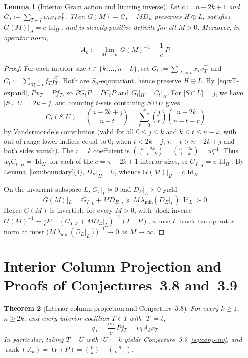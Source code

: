 \documentclass[11pt]{article}
\theoremstyle{plain}
\newtheorem{theorem}{Theorem}
\newtheorem{lemma}[theorem]{Lemma}
\theoremstyle{definition}
\theoremstyle{remark}
\DeclareMathOperator{\rank}{rank}
\DeclareMathOperator{\tr}{tr}
\DeclareMathOperator{\Id}{Id}
\begin{document}
\begin{lemma}[Interior Gram action and limiting inverse]\label{lem:gram}
Let $c := n - 2k + 1$ and $G_I := \sum_{T \in I} w_t x_T x_T^\top$. Then $G(M) = G_I + M D_E$ preserves $H \oplus L$, satisfies $G(M)|_H = c\,\Id_H$, and is strictly positive definite for all $M > 0$. Moreover, in operator norm,
\begin{equation}\label{eq:lim-inv}
A_k := \lim_{M \to \infty} G(M)^{-1} = \frac{1}{c}\,P.
\end{equation}
\end{lemma}

\begin{proof}
For each interior size $t \in \{k, \dots, n - k\}$, set $G_t := \sum_{|T|=t} x_T x_T^\top$ and $C_t := \sum_{|T|=t} f_T f_T^\top$. Both are $S_n$-equivariant, hence preserve $H \oplus L$. By~\eqref{eq:xT-expand}, $P x_T = P f_T$, so $P G_t P = P C_t P$ and $G_t|_H = C_t|_H$. For $|S \cap U| = j$, we have $|S \cup U| = 2k - j$, and counting $t$-sets containing $S \cup U$ gives
\[
C_t(S, U) = \binom{n - 2k + j}{n - t} = \sum_{r=0}^k \binom{j}{r}\binom{n - 2k}{n - t - r}
\]
by Vandermonde's convolution (valid for all $0 \le j \le k$ and $k \le t \le n - k$, with out-of-range lower indices equal to $0$; when $t < 2k - j$, $n - t > n - 2k + j$ and both sides vanish). The $r = k$ coefficient is $\binom{n - 2k}{n - t - k} = \binom{n - 2k}{t - k} = w_t^{-1}$. Thus $w_t G_t|_H = \Id_H$ for each of the $c = n - 2k + 1$ interior sizes, so $G_I|_H = c\,\Id_H$. By Lemma~\ref{lem:boundary}(3), $D_E|_H = 0$, whence $G(M)|_H = c\,\Id_H$.

On the invariant subspace $L$, $G_I|_L \succeq 0$ and $D_E|_L \succ 0$ yield
\[
G(M)|_L = G_I|_L + M D_E|_L \succeq M\,\lambda_{\min}(D_E|_L)\,\Id_L \succ 0.
\]
Hence $G(M)$ is invertible for every $M > 0$, with block inverse $G(M)^{-1} = \frac{1}{c} P + (G_I|_L + M D_E|_L)^{-1}(I - P)$, whose $L$-block has operator norm at most $\bigl(M\,\lambda_{\min}(D_E|_L)\bigr)^{-1} \to 0$ as $M \to \infty$.
\end{proof}

\section{Interior Column Projection and Proofs of Conjectures~3.8 and~3.9}

\begin{theorem}[Interior column projection and Conjecture~3.8]\label{thm:proj}
For every $k \ge 1$, $n \ge 2k$, and every interior coalition $T \in I$ with $|T| = t$,
\begin{equation}\label{eq:col-proj}
q_T = \frac{w_t}{c}\, P f_T = w_t A_k x_T.
\end{equation}
In particular, taking $T = U$ with $|U| = k$ yields Conjecture~3.8~\eqref{eq:conj-inv}, and $\rank(A_k) = \tr(P) = \binom{n}{k} - \binom{n}{k-1}$.
\end{theorem}
\end{document}
